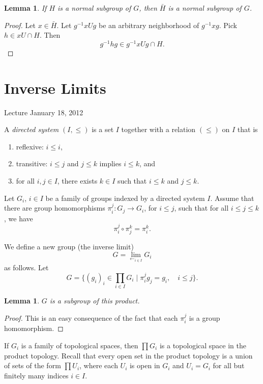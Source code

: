\documentclass{amsart}
\newtheorem{lemma}[equation]{Lemma}
\begin{document}
\begin{lemma}  If $H$ is a normal subgroup of $G$, then $\bar H$ is a normal
subgroup of $G$.
\end{lemma}

\begin{proof}  Let $x\in \bar H$.  Let $g^{-1} x U g$ be an arbitrary neighborhood
of $g^{-1} x g$.  Pick $h\in x U\cap H$.  Then
\[
g^{-1} h g \in g^{-1}x U g \cap H.
\]
\end{proof}

\newpage
\section{Inverse Limits}

Lecture January 18, 2012

A {\it directed system} $(I,\le)$ is a set $I$ together with a relation $(\le)$ on $I$
 that is
\begin{enumerate}
\item reflexive: $i\le i$,
\item transitive: $i\le j$ and $j\le k$ implies $i\le k$, and
\item for all $i, j\in I$, there exists $k\in I$ such that $i\le k$ and $j\le k$.
\end{enumerate}

Let $G_i$, $i\in I$ be a family of groups indexed by a directed system $I$.
Assume that there are group homomorphisms $\pi^j_i:G_j\to G_i$, for $i\le j$,
such that
for all $i\le j\le k$, we have 
\begin{equation}\label{eqn:pi-trans}
\pi^j_i\circ \pi^k_j = \pi^k_i.
\end{equation}

We define a new group (the inverse limit)
\[
G = \lim_{\leftarrow_{i\in I}} G_i
\]
as follows.
Let 
\[
G = \{(g_i)_i \in \prod_{i\in I} G_i\mid \pi^j_i g_j = g_i, \quad i\le j\}.
\]

\begin{lemma}
$G$ is a subgroup of this product.
\end{lemma}

\begin{proof}
This is an easy consequence of the fact that each $\pi^j_i$ is a group
homomorphism.
\end{proof}

If $G_i$ is a family of topological spaces, then
$\prod G_i$ is a topological space in the product topology.  Recall that
every open set in the product topology is a union of sets of the form
$\prod U_i$, where each $U_i$ is open in $G_i$ and $U_i = G_i$ for all
but finitely many indices $i\in I$.
\end{document}
